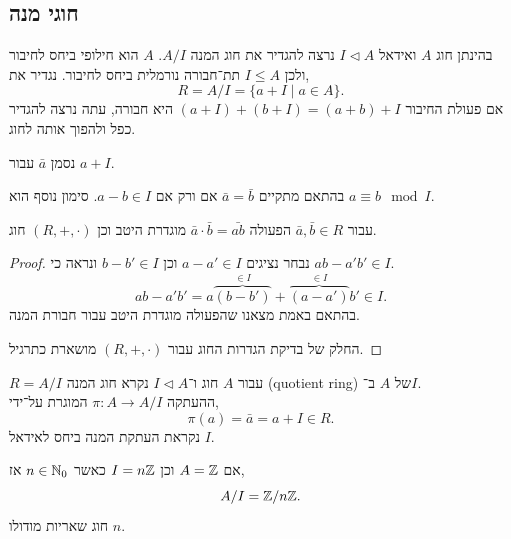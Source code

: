 \subsection{חוגי מנה}
בהינתן חוג $A$ ואידאל $I \triangleleft A$ נרצה להגדיר את חוג המנה $A / I$.
$A$ הוא חילופי ביחס לחיבור ולכן $I \le A$ תת־חבורה נורמלית ביחס לחיבור.
נגדיר את,
\[
	R
	= A / I
	= \{ a + I \mid a \in A \}
.\]
אם פעולת החיבור $(a + I) + (b + I) = (a + b) + I$ היא חבורה, עתה נרצה להגדיר כפל ולהפוך אותה לחוג.
\begin{notation}
	נסמן $\bar{a}$ עבור $a + I$.
\end{notation}
בהתאם מתקיים $\bar{a} = \bar{b}$ אם ורק אם $a - b \in I$.
סימון נוסף הוא $a \equiv b \mod I$.
\begin{proposition}
	עבור $\bar{a}, \bar{b} \in R$ הפעולה $\bar{a} \cdot \bar{b} = \bar{ab}$ מוגדרת היטב וכן $(R, +, \cdot)$ חוג.
\end{proposition}
\begin{proof}
	נבחר נציגים $a - a' \in I$ וכן $b - b' \in I$ ונראה כי $ab - a' b' \in I$.
	\[
		a b - a' b'
		= a \overbrace{(b - b')}^{\in I} + \overbrace{(a - a')}^{\in I} b'
		\in I
	.\]
	בהתאם באמת מצאנו שהפעולה מוגדרת היטב עבור חבורת המנה.

	החלק של בדיקת הגדרות החוג עבור $(R, +, \cdot)$ מושארת כתרגיל.
\end{proof}
\begin{definition}
	$R = A / I$ עבור $A$ חוג ו־$I \triangleleft A$ נקרא חוג המנה (quotient ring) של $A$ ב־$I$. \\
	ההעתקה $\pi : A \to A / I$ המוגרת על־ידי,
	\[
		\pi(a)
		= \bar{a}
		= a + I
		\in R
	.\]
	נקראת העתקת המנה ביחס לאידאל $I$.
\end{definition}
\begin{example}
	אם $A = \mathbb{Z}$ וכן $I = n \mathbb{Z}$ כאשר $n \in \mathbb{N}_0$ אז,
	\[
		A / I
		= \mathbb{Z} / n \mathbb{Z}
	.\]
	חוג שאריות מודולו $n$.
\end{example}

